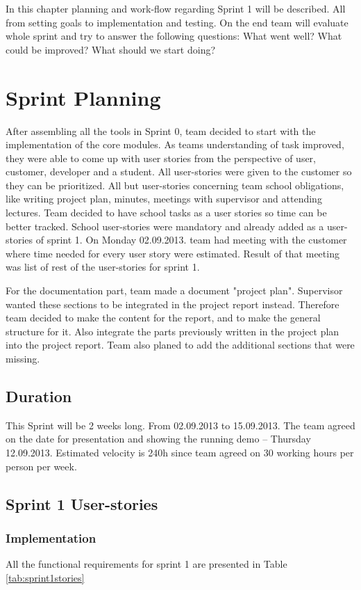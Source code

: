 In this chapter planning and work-flow regarding Sprint 1 will be described. 
All from setting  goals to implementation and testing. On the end team will evaluate whole sprint and try to answer the following questions: What went well? What could be improved? What should we start doing?  


\section{Sprint Planning}
After assembling all the tools in Sprint 0, team decided to start with the implementation of the core modules.
As teams understanding of task improved, they were able to come up with user stories from the perspective of user, customer, developer and a student.
All user-stories were given to the customer so they can be prioritized. 
All but user-stories concerning team school obligations, like writing project plan, minutes, meetings with supervisor and attending lectures.
Team decided to have school tasks as a user stories so time can be better tracked.
School user-stories were mandatory and already added as a user-stories of sprint 1.
On Monday 02.09.2013. team had meeting with the customer where time needed for every user story were estimated.
Result of that meeting was list of rest of the user-stories for sprint 1.

For the documentation part, team made a document "project plan". 
Supervisor wanted these sections to be integrated in the project report instead. 
Therefore team decided to make the content for the report, and to make the general structure for it. 
Also integrate the parts previously written in the project plan into the project report. 
Team also planed to add the additional sections that were missing.

\subsection{Duration}
This Sprint will be 2 weeks long. From 02.09.2013 to 15.09.2013.
The team agreed on the date for presentation and showing the running demo -- Thursday 12.09.2013.
Estimated velocity is 240h since team agreed on 30 working hours per person per week.

\subsection{Sprint 1 User-stories}

\subsubsection*{Implementation}
All the functional requirements for sprint 1 are presented in Table \ref{tab:sprint1stories}

